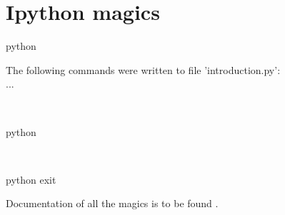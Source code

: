 \documentclass[aspectratio=1610,slidestop]{beamer}
\begin{document}
\section{Ipython magics}

\begin{pframe}
 \begin{ipython}
  \begin{pythonin}{python}
  \end{pythonin}
  \begin{pythonoutnonumber}
The following commands were written to file 'introduction.py':\\
...
  \end{pythonoutnonumber}\\
  \begin{pythonin}{python}
  \end{pythonin}
  \\

  \begin{pythonin}{python}
exit
  \end{pythonin}
 \end{ipython}

 Documentation of all the magics is to be found
  .
\end{pframe}
\end{document}
